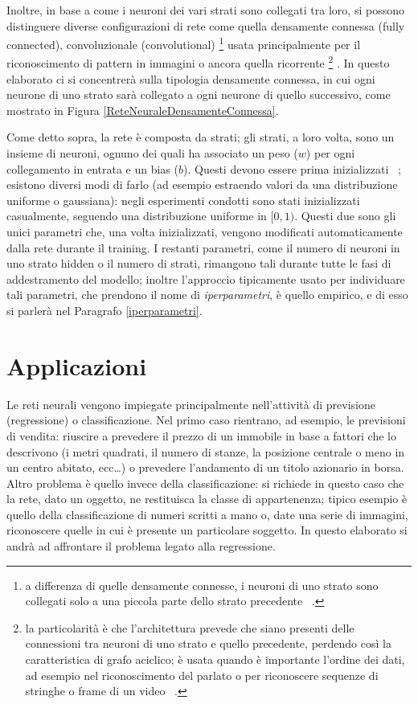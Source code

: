 \documentclass[12pt]{report}
\begin{document}
Inoltre, in base a come i neuroni dei vari strati sono collegati tra loro, si possono distinguere diverse configurazioni di rete come quella densamente connessa (fully connected), convoluzionale (convolutional) \footnote{a differenza di quelle densamente connesse, i neuroni di uno strato sono collegati solo a una piccola parte dello strato precedente ~\cite{Convolutional}.} usata principalmente per il riconoscimento di pattern in immagini o ancora quella ricorrente \footnote{la particolarità è che l'architettura prevede che siano presenti delle connessioni tra neuroni di uno strato e quello precedente, perdendo così la caratteristica di grafo aciclico; è usata quando è importante l'ordine dei dati, ad esempio nel riconoscimento del parlato o per riconoscere sequenze di stringhe o frame di un video ~\cite{Recurrent}.} .
In questo elaborato ci si concentrerà sulla tipologia densamente connessa, in cui ogni neurone di uno strato sarà collegato a ogni neurone di quello successivo, come mostrato in Figura \ref{ReteNeuraleDensamenteConnessa}.

Come detto sopra, la rete è composta da strati; gli strati, a loro volta, sono un insieme di neuroni, ognuno dei quali ha associato un peso ($w$) per ogni collegamento in entrata e un bias ($b$). Questi devono essere prima inizializzati ~\cite{ParametersInitialization}; esistono diversi modi di farlo (ad esempio estraendo valori da una distribuzione uniforme o gaussiana): negli esperimenti condotti sono stati inizializzati casualmente, seguendo una distribuzione uniforme in $[0, 1)$. Questi due sono gli unici parametri che, una volta inizializzati, vengono modificati automaticamente dalla rete durante il training. I restanti parametri, come il numero di neuroni in uno strato hidden o il numero di strati, rimangono tali durante tutte le fasi di addestramento del modello; inoltre l'approccio tipicamente usato per individuare tali parametri, che prendono il nome di \textit{iperparametri}, è quello empirico, e di esso si parlerà nel Paragrafo \ref{iperparametri}.

\section{Applicazioni}
Le reti neurali vengono impiegate principalmente nell’attività di previsione (regressione) o classificazione.
Nel primo caso rientrano, ad esempio, le previsioni di vendita: riuscire a prevedere il prezzo di un immobile in base a fattori che lo descrivono (i metri quadrati, il numero di stanze, la posizione centrale o meno in un centro abitato, ecc…) o prevedere l’andamento di un titolo azionario in borsa.
Altro problema è quello invece della classificazione: si richiede in questo caso che la rete, dato un oggetto, ne restituisca la classe di appartenenza; tipico esempio è quello della classificazione di numeri scritti a mano o, date una serie di immagini, riconoscere quelle in cui è presente un particolare soggetto.
In questo elaborato si andrà ad affrontare il problema legato alla regressione.
\end{document}
